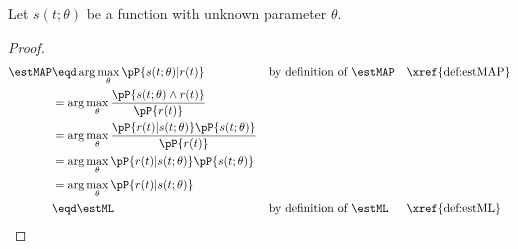 \begin{theorem}
\label{thm:map=ml}
Let $s(t;\theta)$ be a function with unknown parameter $\theta$.
\end{theorem}
\begin{proof}
\begin{align*}
   \estMAP
     &\eqd \arg\max_{\theta} \pP{s(t;\theta)|r(t)}
     &&    \text{by definition of $\estMAP$}
     &&    \text{\xref{def:estMAP}}
   \\&=    \arg\max_{\theta} \frac{\pP{s(t;\theta) \land r(t)}}
                               {\pP{r(t)}}
   \\&=    \arg\max_{\theta} \frac{\pP{r(t) | s(t;\theta) }\pP{s(t;\theta) }}
                               {\pP{r(t)}}
   \\&=    \arg\max_{\theta} \pP{r(t) | s(t;\theta) }\pP{s(t;\theta) }
   \\&=    \arg\max_{\theta} \pP{r(t) | s(t;\theta) }
   \\&\eqd \estML
     &&  \text{by definition of $\estML$}
     &&  \text{\xref{def:estML}}
\end{align*}
\end{proof}




